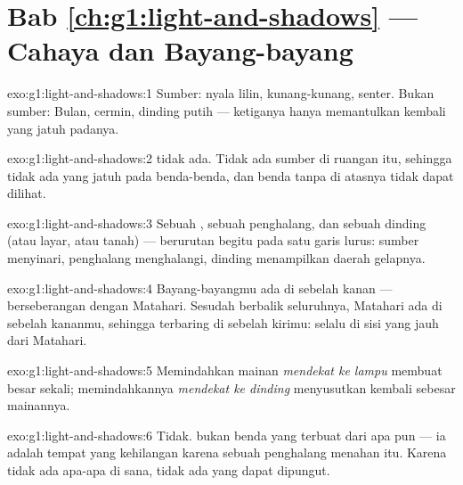 \section*{Bab \ref{ch:g1:light-and-shadows} --- Cahaya dan Bayang-bayang}

\begin{solution}{exo:g1:light-and-shadows:1}
Sumber: nyala lilin, kunang-kunang, senter. Bukan sumber: Bulan,
cermin, dinding putih --- ketiganya hanya memantulkan kembali 
yang jatuh padanya.
\end{solution}

\begin{solution}{exo:g1:light-and-shadows:2}
 tidak ada. Tidak ada sumber di ruangan itu, sehingga tidak
ada  yang jatuh pada benda-benda, dan benda tanpa  di
atasnya tidak dapat dilihat.
\end{solution}

\begin{solution}{exo:g1:light-and-shadows:3}
Sebuah , sebuah penghalang, dan sebuah dinding (atau
layar, atau tanah) --- berurutan begitu pada satu garis lurus: sumber
menyinari, penghalang menghalangi, dinding menampilkan daerah gelapnya.
\end{solution}

\begin{solution}{exo:g1:light-and-shadows:4}
Bayang-bayangmu ada di sebelah kanan --- berseberangan dengan
Matahari. Sesudah berbalik seluruhnya, Matahari ada di sebelah
kananmu, sehingga  terbaring di sebelah kirimu: selalu di
sisi yang jauh dari Matahari.
\end{solution}

\begin{solution}{exo:g1:light-and-shadows:5}
Memindahkan mainan \emph{mendekat ke lampu} membuat 
besar sekali; memindahkannya \emph{mendekat ke dinding} menyusutkan
 kembali sebesar mainannya.
\end{solution}

\begin{solution}{exo:g1:light-and-shadows:6}
Tidak.  bukan benda yang terbuat dari apa pun --- ia
adalah tempat yang kehilangan  karena sebuah penghalang menahan
 itu. Karena tidak ada apa-apa di sana, tidak ada yang dapat
dipungut.
\end{solution}

